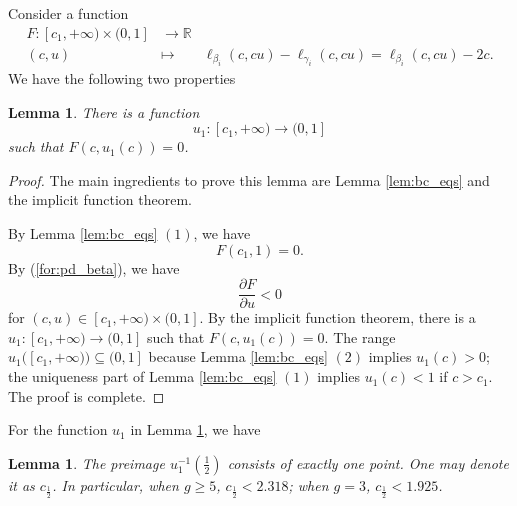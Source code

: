 \documentclass[UTF8]{amsart}
\newtheorem{lemma}[theorem]{Lemma}
\numberwithin{equation}{section}
\theoremstyle{definition}
\theoremstyle{example}
\theoremstyle{remark}
\begin{document}
Consider a function
\begin{eqnarray*}
 F: [c_1, +\infty)\times (0,1] & \to \mathbb{R} \\
 (c,u) &\mapsto & \ell_{\beta_i}(c,cu) - \ell_{\gamma_i}(c,cu) = \ell_{\beta_i}(c,cu) - 2c. 
\end{eqnarray*}
We have the following two properties
\begin{lemma}
 There is a function 
 \[
  u_1:[c_1, +\infty) \to (0,1]
 \]
 such that $F(c, u_1(c)) = 0$. 
 \label{lem:u_implicit}
\end{lemma}
\begin{proof}
 The main ingredients to prove this lemma are Lemma \ref{lem:bc_eqs} and the implicit function theorem. 

 By Lemma \ref{lem:bc_eqs} $(1)$, we have
 \begin{equation*}
 F(c_1, 1) = 0. 
 \end{equation*}
 By (\ref{for:pd_beta}), we have
 \begin{equation*}
  \frac{\partial F}{\partial u} < 0
 \end{equation*}
 for $(c,u) \in [c_1, +\infty)\times (0,1]$. 
 By the implicit function theorem, there is a $u_1: [c_1, +\infty) \to (0,1]$ such that $F(c, u_1(c)) = 0$. 
The range $u_1( [c_1, +\infty)) \subseteq (0,1]$ 
because Lemma \ref{lem:bc_eqs} $(2)$ implies $u_1(c) >0$; the uniqueness part of Lemma \ref{lem:bc_eqs} $(1)$ implies $u_1(c) <1$ if $c>c_1$. 
The proof is complete. 
\end{proof}

For the function $u_1$ in Lemma \ref{lem:u_implicit}, we have
\begin{lemma}
 The preimage $u_1^{-1}( \frac{1}{2})$ consists of exactly one point. One may denote it as $c_{ \frac{1}{2}}$. In particular, when $g \ge 5$,  $c_{ \frac{1}{2}} < 2.318$; when $g = 3$, $c_{ \frac{1}{2}} < 1.925$. 
 \label{lem:u_level}
\end{lemma}
\end{document}
